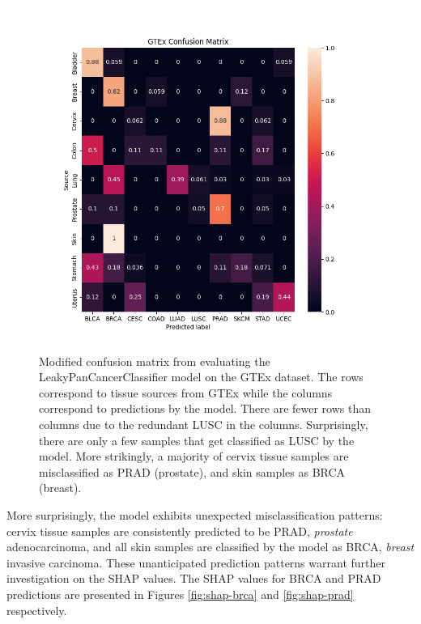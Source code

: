 \documentclass{l4proj}
\begin{document}
\begin{figure}[h]
    \centering
    \includegraphics[width=0.8\linewidth]{images/confusion_matrix.png}
    \caption{Modified confusion matrix from evaluating the LeakyPanCancerClassifier model on the GTEx dataset. The rows correspond to tissue sources from GTEx while the columns correspond to predictions by the model. There are fewer rows than columns due to the redundant LUSC in the columns. Surprisingly, there are only a few samples that get classified as LUSC by the model. More strikingly, a majority of cervix tissue samples are misclassified as PRAD (prostate), and skin samples as BRCA (breast).}
    \label{fig:conf-mat-gtex}
\end{figure}

More surprisingly, the model exhibits unexpected misclassification patterns: cervix tissue samples are consistently predicted to be PRAD, \emph{prostate} adenocarcinoma, and all skin samples are classified by the model as BRCA, \emph{breast} invasive carcinoma. These unanticipated prediction patterns warrant further investigation on the SHAP values. The SHAP values for BRCA and PRAD predictions are presented in Figures \ref{fig:shap-brca} and \ref{fig:shap-prad} respectively.
\end{document}
